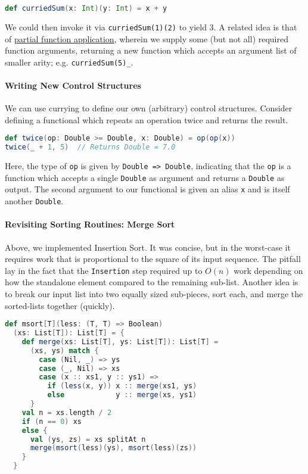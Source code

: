 \documentclass[12pt,letterpaper,twoside]{article}
\begin{document}
\begin{lstlisting}[language=Scala] 
def curriedSum(x: Int)(y: Int) = x + y 
\end{lstlisting} 
We could then invoke it via \texttt{curriedSum(1)(2)} to yield 3. A related idea
is that of 
\href{https://en.wikipedia.org/wiki/Partial_application}{partial function application}, 
wherein we supply some (but not all)
required function arguments, returning a new function which accepts an argument list
of smaller arity; e.g. \texttt{curriedSum(5)\_}.

\paragraph{Writing New Control Structures}
We can use currying to define our own (arbitrary) control structures. Consider defining
a functional which repeats an operation twice and returns the result.
\begin{lstlisting}[language=Scala]
def twice(op: Double >= Double, x: Double) = op(op(x))
twice(_ + 1, 5)  // Returns Double = 7.0 
\end{lstlisting}
Here, the type of \texttt{op} is given by \texttt{Double => Double}, indicating that
the \texttt{op} is a function which accepts a single \texttt{Double} as argument
and returns a \texttt{Double} as output. The second argument to our functional is
given an alias \texttt{x} and is itself another \texttt{Double}.

\paragraph{Revisiting Sorting Routines: Merge Sort} 
Above, we implemented Insertion Sort. It was concise,
but in the worst-case it requires work that is proportional to the square of its input
sequence. The pitfall lay in the fact that the \texttt{Insertion} step required up
to $O(n)$ work depending on how the standalone element compared to the remaining sub-list.
Another idea is to break our input list into two equally sized sub-pieces, sort each, and
merge the sorted-lists together (quickly).

{\small
\begin{lstlisting}[language=Scala]
def msort[T](less: (T, T) => Boolean)
  (xs: List[T]): List[T] = {
    def merge(xs: List[T], ys: List[T]): List[T] =
      (xs, ys) match {
        case (Nil, _) => ys
        case (_, Nil) => xs
        case (x :: xs1, y :: ys1) =>
          if (less(x, y)) x :: merge(xs1, ys)
          else            y :: merge(xs, ys1)
      }
    val n = xs.length / 2
    if (n == 0) xs
    else {
      val (ys, zs) = xs splitAt n
      merge(msort(less)(ys), msort(less)(zs))
    }
  }  
\end{lstlisting}
}
\end{document}
